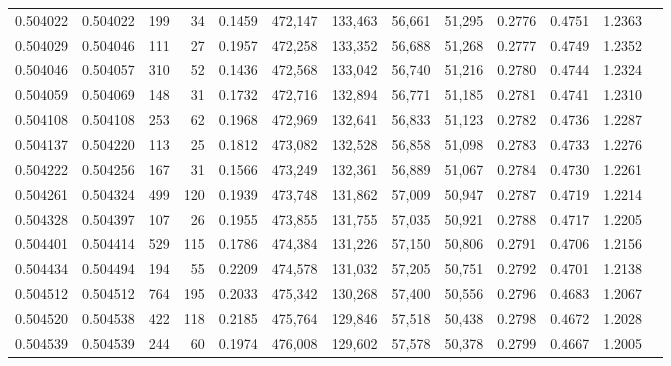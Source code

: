 \begin{tabular}{rrrrrrrrrrrrr}
0.504022 & 0.504022 &   199 &    34 &                                     0.1459 & 472,147 & 133,463 &  56,661 &  51,295 & 0.2776 & 0.4751 & 1.2363 \\
0.504029 & 0.504046 &   111 &    27 &                                     0.1957 & 472,258 & 133,352 &  56,688 &  51,268 & 0.2777 & 0.4749 & 1.2352 \\
0.504046 & 0.504057 &   310 &    52 &                                     0.1436 & 472,568 & 133,042 &  56,740 &  51,216 & 0.2780 & 0.4744 & 1.2324 \\
0.504059 & 0.504069 &   148 &    31 &                                     0.1732 & 472,716 & 132,894 &  56,771 &  51,185 & 0.2781 & 0.4741 & 1.2310 \\
0.504108 & 0.504108 &   253 &    62 &                                     0.1968 & 472,969 & 132,641 &  56,833 &  51,123 & 0.2782 & 0.4736 & 1.2287 \\
0.504137 & 0.504220 &   113 &    25 &                                     0.1812 & 473,082 & 132,528 &  56,858 &  51,098 & 0.2783 & 0.4733 & 1.2276 \\
0.504222 & 0.504256 &   167 &    31 &                                     0.1566 & 473,249 & 132,361 &  56,889 &  51,067 & 0.2784 & 0.4730 & 1.2261 \\
0.504261 & 0.504324 &   499 &   120 &                                     0.1939 & 473,748 & 131,862 &  57,009 &  50,947 & 0.2787 & 0.4719 & 1.2214 \\
0.504328 & 0.504397 &   107 &    26 &                                     0.1955 & 473,855 & 131,755 &  57,035 &  50,921 & 0.2788 & 0.4717 & 1.2205 \\
0.504401 & 0.504414 &   529 &   115 &                                     0.1786 & 474,384 & 131,226 &  57,150 &  50,806 & 0.2791 & 0.4706 & 1.2156 \\
0.504434 & 0.504494 &   194 &    55 &                                     0.2209 & 474,578 & 131,032 &  57,205 &  50,751 & 0.2792 & 0.4701 & 1.2138 \\
0.504512 & 0.504512 &   764 &   195 &                                     0.2033 & 475,342 & 130,268 &  57,400 &  50,556 & 0.2796 & 0.4683 & 1.2067 \\
0.504520 & 0.504538 &   422 &   118 &                                     0.2185 & 475,764 & 129,846 &  57,518 &  50,438 & 0.2798 & 0.4672 & 1.2028 \\
0.504539 & 0.504539 &   244 &    60 &                                     0.1974 & 476,008 & 129,602 &  57,578 &  50,378 & 0.2799 & 0.4667 & 1.2005 \\

\end{tabular}
